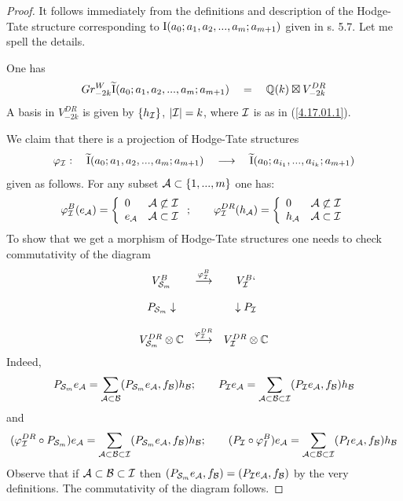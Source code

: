 \documentclass[10pt]{article}
\begin{document}
\begin{proof} It follows immediately from the definitions and 
description of the Hodge-Tate 
structure corresponding to ${\rm I}(a_0; a_1, a_2, ..., a_m; a_{m+1})$ given in s. 5.7. 
Let me spell the details. 

 One has 
$$
Gr^W_{-2k}{\widetilde {\rm I}}(a_0; a_1, a_2, ..., a_m; a_{m+1}) \quad = \quad 
{\mathbb Q}(k) \boxtimes V^{DR}_{-2k}
$$
A basis  in $V^{DR}_{-2k}$ is given by  $\{h_{\cal I}\}$, $|{\cal I}|=k$, where 
${\cal I}$ is as in  (\ref{4.17.01.1}).


We claim that there is  a projection of Hodge-Tate  structures 
$$
\varphi_{\cal I}: \quad {\widetilde {\rm I}}(a_0; a_1, a_2, ..., a_m; a_{m+1}) \quad \longrightarrow \quad 
{\widetilde {\rm I}}(a_0; a_{i_1},  ..., a_{i_k}; a_{m+1})
$$
given as follows. For any subset ${\cal A} \subset \{1, ..., m\}$ one has:
$$
\varphi_{\cal I}^B(e_{\cal A}) = \left\{ \begin{array}{llll}
 0&  {\cal A} \not \subset {\cal I} \\ 
e_{\cal A}&  {\cal A} \subset {\cal I} \end{array} \right.; \qquad \varphi_{\cal I}^{DR}(h_{\cal A}) = \left\{ \begin{array}{llll}
 0&  {\cal A} \not \subset {\cal I} \\ 
h_{\cal A}&  {\cal A} \subset {\cal I} \end{array} \right. 
$$
To show that we get a morphism of Hodge-Tate structures one needs to 
check commutativity of the diagram
$$
\begin{array}{ccc}
V^B_{{\cal S}_m}& \stackrel{\varphi^B_{\cal I}}{\longrightarrow}& V^B_{\cal I}`\\
&&\\
P_{{\cal S}_m}\downarrow && \downarrow P_{\cal I}\\
&&\\
V^{DR}_{{\cal S}_m}\otimes {\mathbb C}&\stackrel{\varphi^{DR}_{\cal I}}{\longrightarrow}&
V^{DR}_{\cal I}\otimes {\mathbb C}
\end{array}
$$
Indeed, 
$$
P_{{\cal S}_m}e_{\cal A}= \sum_{{\cal A} \subset {\cal B}} 
(P_{{\cal S}_m}e_{\cal A}, f_{\cal B})h_{\cal B};
\qquad P_{\cal I}e_{\cal A}= \sum_{{\cal A} \subset {\cal B} \subset {\cal I}} 
(P_{\cal I}e_{\cal A}, f_{\cal B})h_{\cal B}
$$
and 
$$
(\varphi^{DR}_{\cal I} \circ P_{{\cal S}_m}) e_{\cal A} = 
\sum_{{\cal A} \subset {\cal B} \subset {\cal I}} (P_{{\cal S}_m} e_{\cal A}, f_{\cal B})h_{\cal B};
\qquad (P_{\cal I} \circ \varphi^{B}_I) e_{\cal A} = 
\sum_{{\cal A} \subset {\cal B} \subset {\cal I}} (P_{I} e_{\cal A}, f_{\cal B})h_{\cal B}
$$
Observe that if ${\cal A} \subset {\cal B} \subset {\cal I}$ then $
(P_{{\cal S}_m} e_{\cal A}, f_{\cal B}) = (P_{\cal I}e_{\cal A}, f_{\cal B})$ 
by the very definitions.  
The commutativity of the diagram follows.



\end{proof}
\end{document}
